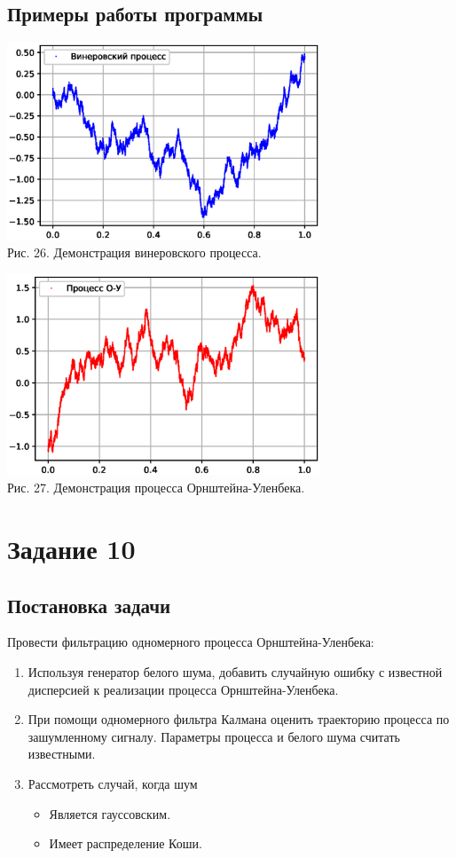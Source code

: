 \documentclass[11pt]{article}
\begin{document}
\subsection{Примеры работы программы}
\begin{center}
	\includegraphics[width=0.7\textwidth]{9_1.eps}\\
	{Рис. 26. Демонстрация винеровского процесса. }
\end{center}
\begin{center}
	\includegraphics[width=0.7\textwidth]{9_2.eps}\\
	{Рис. 27. Демонстрация процесса Орнштейна-Уленбека. }
\end{center}

\newpage

\section{Задание 10}
\subsection{Постановка задачи}
Провести фильтрацию одномерного процесса Орнштейна-Уленбека:
\begin{enumerate}
	\item Используя генератор белого шума, добавить случайную ошибку с известной дисперсией к реализации процесса Орнштейна-Уленбека.
	\item При помощи одномерного фильтра Калмана оценить траекторию процесса по зашумленному сигналу. Параметры процесса и белого шума считать известными.
	\item Рассмотреть случай, когда шум
	\begin{itemize}
		\item Является гауссовским.
		\item Имеет распределение Коши.
	\end{itemize}
\end{enumerate}
\end{document}
